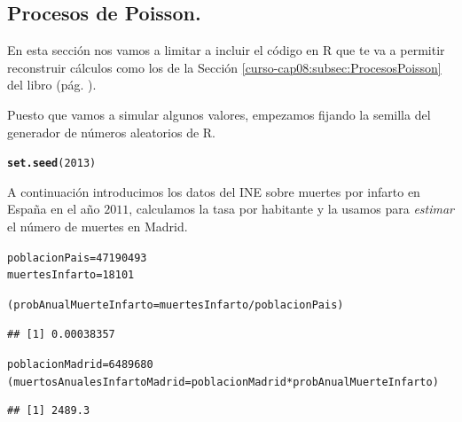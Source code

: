 \documentclass[10pt,a4paper]{article}\usepackage[]{graphicx}\usepackage[]{color}
\makeatletter
\newcommand{\hlnum}[1]{\textcolor[rgb]{0.686,0.059,0.569}{#1}}%
\newcommand{\hlopt}[1]{\textcolor[rgb]{0,0,0}{#1}}%
\newcommand{\hlstd}[1]{\textcolor[rgb]{0.345,0.345,0.345}{#1}}%
\newcommand{\hlkwb}[1]{\textcolor[rgb]{0.69,0.353,0.396}{#1}}%
\newcommand{\hlkwd}[1]{\textcolor[rgb]{0.737,0.353,0.396}{\textbf{#1}}}%
\newenvironment{kframe}{%
 \def\at@end@of@kframe{}%
 \ifinner\ifhmode%
  \def\at@end@of@kframe{\end{minipage}}%
  \begin{minipage}{\columnwidth}%
 \fi\fi%
 \def\FrameCommand##1{\hskip\@totalleftmargin \hskip-\fboxsep
 \colorbox{shadecolor}{##1}\hskip-\fboxsep
     \hskip-\linewidth \hskip-\@totalleftmargin \hskip\columnwidth}%
 \MakeFramed {\advance\hsize-\width
   \@totalleftmargin\z@ \linewidth\hsize
   \@setminipage}}%
 {\par\unskip\endMakeFramed%
 \at@end@of@kframe}
\newenvironment{knitrout}{}{} %
\newcounter {cont01}
\makeatother
\begin{document}
\subsection{Procesos de Poisson.}


En esta sección nos vamos a limitar a incluir el código en R que te va a permitir reconstruir cálculos como los de la Sección \ref{curso-cap08:subsec:ProcesosPoisson} del libro (pág. \pageref{curso-cap08:subsec:ProcesosPoisson}).

Puesto que vamos a simular algunos valores, empezamos fijando la semilla del generador de números aleatorios de R.

\begin{knitrout}
\color{fgcolor}\begin{kframe}
\begin{alltt}
\hlkwd{set.seed}\hlstd{(}\hlnum{2013}\hlstd{)}
\end{alltt}
\end{kframe}
\end{knitrout}

A continuación introducimos los datos del INE sobre muertes por infarto en España en el año $2011$, calculamos la tasa por habitante y la usamos para {\em estimar} el número de muertes en Madrid.

\begin{knitrout}
\color{fgcolor}\begin{kframe}
\begin{alltt}
\hlstd{poblacionPais} \hlkwb{=} \hlnum{47190493}
\hlstd{muertesInfarto} \hlkwb{=} \hlnum{18101}

\hlstd{(probAnualMuerteInfarto} \hlkwb{=} \hlstd{muertesInfarto}\hlopt{/}\hlstd{poblacionPais  )}
\end{alltt}
\begin{verbatim}
## [1] 0.00038357
\end{verbatim}
\begin{alltt}
\hlstd{poblacionMadrid} \hlkwb{=} \hlnum{6489680}
\hlstd{(muertosAnualesInfartoMadrid} \hlkwb{=} \hlstd{poblacionMadrid} \hlopt{*} \hlstd{probAnualMuerteInfarto)}
\end{alltt}
\begin{verbatim}
## [1] 2489.3
\end{verbatim}
\end{kframe}
\end{knitrout}
\end{document}

